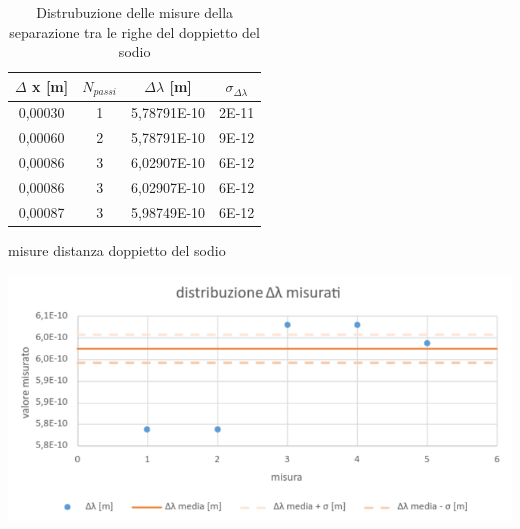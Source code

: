 \documentclass{article}
\begin{document}
    \begin{table}[H]
     \begin{minipage}[b]{0.35\linewidth}
        \centering
            \begin{tabular}{ cccc } 
                \toprule 
                $\Delta$ x [m] & $N_{passi}$ & $\Delta\lambda$ [m] &$ \sigma_{\Delta\lambda}$ \\
                \midrule 
                0,00030	&	1	&	5,78791E-10	&	2E-11	\\
                0,00060	&	2	&	5,78791E-10	&	9E-12	\\
                0,00086	&	3	&	6,02907E-10	&	6E-12	\\
                0,00086	&	3	&	6,02907E-10	&	6E-12	\\
                0,00087	&	3	&	5,98749E-10	&	6E-12	\\
                \bottomrule           
            \end{tabular}
            \caption{misure distanza doppietto del sodio}
           \label{misure: doppietto sodio}
           \end{minipage}
           \begin{minipage}[b]{0.65\linewidth}
                   \centering
                   \includegraphics[scale= 0.3]{../images/doppietto_sodio.png}
                   \caption{Distrubuzione delle misure della separazione tra le righe del doppietto del sodio}
                   \label{fig:my_label}     
           \end{minipage}
        \end{table}
\end{document}
